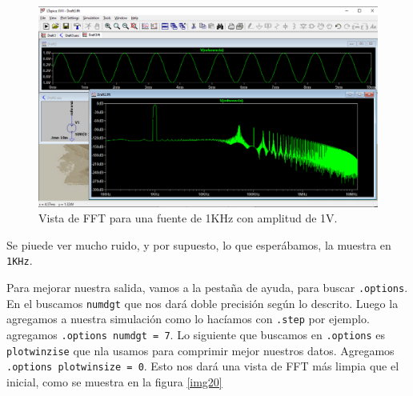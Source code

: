 \documentclass[a4paper]{article} %
\begin{document}
\begin{figure} %
	\centering %
	\includegraphics[scale=0.3]{IMAGENES/img19} %
	\caption{Vista de FFT para una fuente de 1KHz con amplitud de 1V.} %
	\label{img19} %
\end{figure} %

Se piuede ver mucho ruido, y por supuesto, lo que esperábamos, la muestra en \texttt{1KHz}.

Para mejorar nuestra salida, vamos a la pestaña de ayuda, para buscar \texttt{.options}. En el buscamos \texttt{numdgt} que nos dará doble precisión según lo descrito. Luego la agregamos a nuestra simulación como lo hacíamos con \texttt{.step} por ejemplo. agregamos \texttt{.options numdgt = 7}. Lo siguiente que buscamos en \texttt{.options} es \texttt{plotwinzise} que nla usamos para comprimir mejor nuestros datos. Agregamos \texttt{.options plotwinsize = 0}. Esto nos dará una vista de FFT más limpia que el inicial, como se muestra en la figura \eqref{img20}
\end{document}
